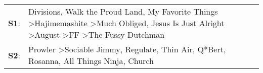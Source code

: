 \begin{supertabular}{p{0.03\textwidth}p{0.92\textwidth}}
 \textbf{S1}:  &  Divisions\textsuperscript{}, \enspace Walk the Proud Land\textsuperscript{}, \enspace My Favorite Things\textsuperscript{} \textgreater \enspace Hajimemashite\textsuperscript{} \textgreater \enspace Much Obliged\textsuperscript{}, \enspace Jesus Is Just Alright\textsuperscript{} \textgreater \enspace August\textsuperscript{} \textgreater \enspace FF\textsuperscript{} \textgreater \enspace The Fussy Dutchman\textsuperscript{}  \enspace  \\
 \textbf{S2}:  &                                                                                                                             Prowler\textsuperscript{} \textgreater \enspace Sociable Jimmy\textsuperscript{}, \enspace Regulate\textsuperscript{}, \enspace Thin Air\textsuperscript{}, \enspace Q*Bert\textsuperscript{}, \enspace Rosanna\textsuperscript{}, \enspace All Things Ninja\textsuperscript{}, \enspace Church\textsuperscript{}  \enspace  \\
\end{supertabular}
